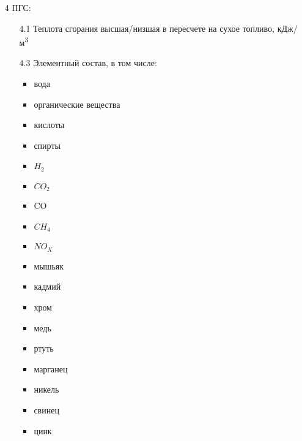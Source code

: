 \documentclass[russian,utf8]{eskdtext}
\begin{document}
\begin{enumerate}
   \item[4] ПГС:
      \begin{enumerate}
      \item[4.1] Теплота сгорания высшая/низшая в пересчете на сухое топливо, кДж/м\textsuperscript{3}
      \item[4.3] Элементный состав, в том числе:
      	\begin{itemize}
      	\item вода
      	\item органические вещества
      	\item кислоты
      	\item спирты 
      	\item $H_{2}$
      	\item $CO_{2}$
      	\item CO
      	\item $CH_{4}$
      	\item $NO_{X}$
      	\item мышьяк
      	\item кадмий
      	\item хром
      	\item медь
      	\item ртуть
      	\item марганец
      	\item никель
      	\item свинец
      	\item цинк
         \end{itemize}
      \end{enumerate} 
      

\end{enumerate}
\end{document}
